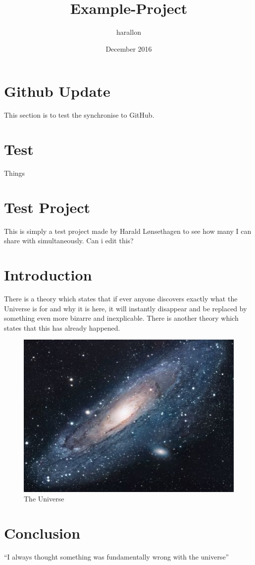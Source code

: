 \documentclass{article}
\title{Example-Project}
\author{harallon }
\date{December 2016}
\begin{document}
\maketitle

\section{Github Update}
This section is to test the synchronise to GitHub. 

\section{Test}
Things


\section{Test Project}
This is simply a test project made by Harald Lønsethagen to see how many I can share with simultaneously.
Can i edit this?

\section{Introduction}
There is a theory which states that if ever anyone discovers exactly what the Universe is for and why it is here, it will instantly disappear and be replaced by something even more bizarre and inexplicable.
There is another theory which states that this has already happened.

\begin{figure}[h!]
\centering
\includegraphics[scale=1.7]{universe.jpg}
\caption{The Universe}
\label{fig:univerise}
\end{figure}

\section{Conclusion}
``I always thought something was fundamentally wrong with the universe'' \citep{adams1995hitchhiker}



\end{document}
